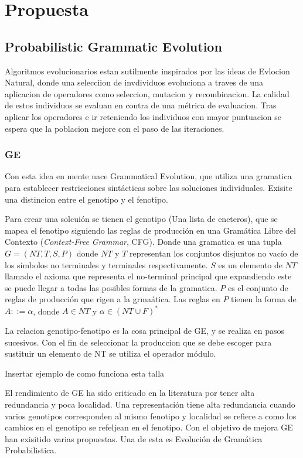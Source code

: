 \chapter{Propuesta}\label{chapter:proposal}

\section{Probabilistic Grammatic Evolution}

Algoritmos evolucionarios estan sutilmente inspirados por las ideas de Evlocion Natural, donde una selecciion de invdividuos evoluciona a traves de una aplicacion de operadores como seleccion, mutacion y recombinacion. La calidad de estos individuos se evaluan en contra de una m\'etrica de evaluacion. Tras aplicar los operadores e ir reteniendo los individuos con mayor puntuacion se espera que la poblacion mejore con el paso de las iteraciones.

\subsection{GE}
Con esta idea en mente nace Grammatical Evolution, que utiliza una gramatica para establecer restricciones sint\'acticas sobre las soluciones individuales. Exisite una distincion entre el genotipo y el fenotipo. 

Para crear una solcui\'on se tienen el genotipo (Una lista de eneteros), que se mapea el fenotipo siguiendo las reglas de producci\'on en una Gram\'atica Libre del Contexto (\textit{Context-Free Grammar}, CFG). Donde una gramatica es una tupla $G = (NT, T, S, P)$ donde $NT$ y $T$ representan los conjuntos disjuntos no vac\'io de los s\'imbolos no terminales y terminales respectivamente. $S$ es un elemento de $NT$ llamado el axioma que representa el no-terminal principal que expandiendo este se puede llegar a todas las posibles formas de la gramatica. $P$ es el conjunto de reglas de producci\'on que rigen a la grma\'atica. Las reglas en $P$ tienen la forma de $A ::= \alpha$, donde $A \in NT$ y  $\alpha \in (NT \cup F)^*$ 

La relacion genotipo-fenotipo es la cosa principal de GE, y se realiza en pasos sucesivos. Con el fin de seleccionar la produccion que se debe escoger para sustituir un elemento de NT se utiliza el operador m\'odulo.

Insertar ejemplo de como funciona esta talla

El rendimiento de GE ha sido criticado en la literatura por tener alta redundancia y poca localidad. Una representaci\'on tiene alta redundancia cuando varios genotipos corresponden al mismo fenotipo y localidad se refiere a como los cambios en el genotipo se refeljean en el fenotipo. Con el objetivo de mejora GE han exisitido varias propuestas. Una de esta es Evoluci\'on de Gram\'atica Probabilistica.


